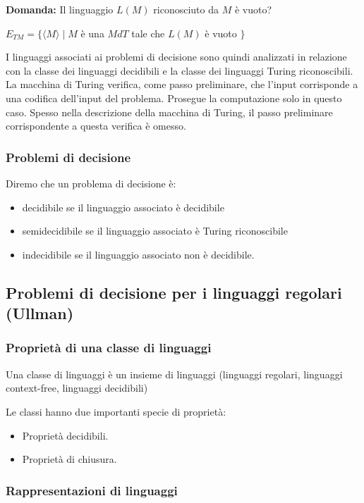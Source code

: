 \textbf{Domanda:} Il linguaggio $L(M)$ riconosciuto da $M$ è vuoto?

$E_{T M}=\{\langle M\rangle \mid M$ è una $M d T$ tale che $L(M)$ è vuoto $\}$

\vspace{5mm}

I linguaggi associati ai problemi di decisione sono quindi
analizzati in relazione con la classe dei linguaggi decidibili e la
classe dei linguaggi Turing riconoscibili.
La macchina di Turing verifica, come passo preliminare, che
l'input corrisponde a una codifica dell'input del problema.
Prosegue la computazione solo in questo caso.
Spesso nella descrizione della macchina di Turing, il passo
preliminare corrispondente a questa verifica è omesso.

\subsubsection{Problemi di decisione}

Diremo che un problema di decisione è:
\begin{itemize}
    \item decidibile se il linguaggio associato è decidibile
    \item semidecidibile se il linguaggio associato è Turing riconoscibile
    \item indecidibile se il linguaggio associato non è decidibile.
\end{itemize}

\subsection{Problemi di decisione per i
linguaggi regolari (Ullman)}

\subsubsection{Proprietà di una classe di linguaggi}

Una classe di linguaggi è un insieme di
linguaggi (linguaggi regolari, linguaggi context-free, linguaggi decidibili)

Le classi hanno due importanti specie
di proprietà:
\begin{itemize}
    \item Proprietà decidibili.
    \item Proprietà di chiusura.
\end{itemize}

\subsubsection{Rappresentazioni di linguaggi}


